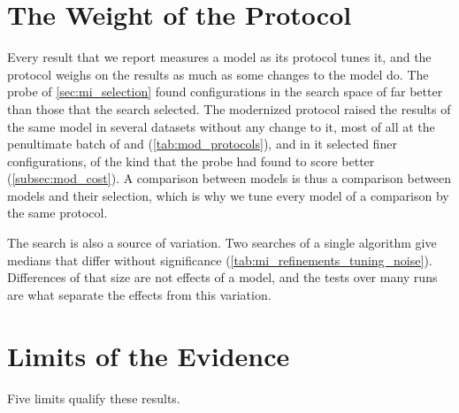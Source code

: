 \section{The Weight of the Protocol}
\label{sec:disc_protocol}

Every result that we report measures a model as its protocol tunes it, and the protocol weighs on the results as much as some changes to the model do. The probe of \cref{sec:mi_selection} found configurations in the search space of \MicroTEDAClusPlus far better than those that the search selected. The modernized protocol raised the results of the same model in several datasets without any change to it, most of all at the penultimate batch of \BenchmarkOne and \Cassini (\cref{tab:mod_protocols}), and in \ChameleonDSThree it selected finer configurations, of the kind that the probe had found to score better (\cref{subsec:mod_cost}). A comparison between models is thus a comparison between models and their selection, which is why we tune every model of a comparison by the same protocol.

The search is also a source of variation. Two searches of a single algorithm give medians that differ without significance (\cref{tab:mi_refinements_tuning_noise}). Differences of that size are not effects of a model, and the tests over many runs are what separate the effects from this variation.

\section{Limits of the Evidence}
\label{sec:disc_limits}

Five limits qualify these results.

